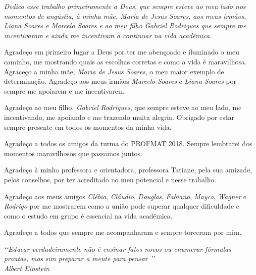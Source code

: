 \documentclass[12pt, openright, a4paper, brazil, english, french, spanish, bibjustif, openany, oneside]{abntex2}
\begin{document}

\begin{dedicatoria}
   \vspace*{\fill}
   \centering
   \noindent
    \textit{Dedico esse trabalho primeiramente a Deus, que sempre esteve ao meu lado nos momentos de angústia, à minha mãe, Maria de Jesus Soares, aos meus irmãos, Liana Soares e Marcelo Soares e ao meu filho Gabriel Rodrigues que sempre me incentivaram e ainda me incentivam a continuar na vida acadêmica.}\vspace*{\fill}
    
\end{dedicatoria}


\begin{agradecimentos}

Agradeço em primeiro lugar a Deus por ter me abençoado e iluminado o meu caminho, me mostrando quais as escolhas corretas e como a vida é maravilhosa. Agraceço a minha mãe, \textit{Maria de Jesus Soares}, o meu maior exemplo de determinação. Agradeço aos meus irmãos \textit{Marcelo Soares} e \textit{Liana Soares} por sempre me apoiarem e me incentivarem.

Agradeço ao meu filho, \textit{Gabriel Rodrigues}, que sempre esteve ao meu lado, me incentivando, me apoiando e me trazendo muita alegria. Obrigado por estar sempre presente em todos os momentos da minha vida.

Agradeço a todos os amigos da turma do PROFMAT 2018. Sempre lembrarei dos momentos maravilhosos que passamos juntos.

Agradeço à minha professora e orientadora, professora Tatiane, pela sua amizade, pelos conselhos, por ter acreditado no meu potencial e nesse trabalho.

Agradeço aos meus amigos \textit{Clébia}, \textit{Cláudio}, \textit{Douglas}, \textit{Fabiano}, \textit{Mayco}, \textit{Wagner} e \textit{Rodrigo} por me mostrarem como a união pode superar qualquer dificuldade e como o estudo em grupo é essencial na vida acadêmica.

Agradeço a todos que sempre me acompanharam e sempre torceram por mim.

\end{agradecimentos}


\begin{epigrafe}
    \vspace*{\fill}
	\begin{flushright}
		\textit{\lq\lq Educar verdadeiramente não é ensinar fatos novos ou enumerar fórmulas prontas, mas sim preparar a mente para pensar \rq\rq\\ Albert Einstein}
	\end{flushright}
\end{epigrafe}
\end{document}
